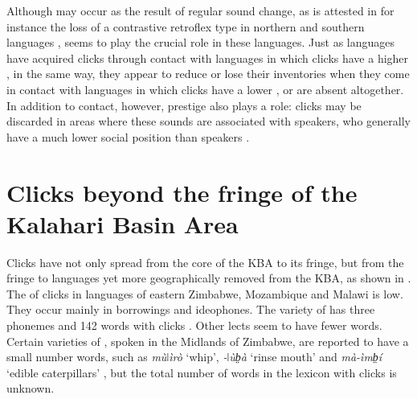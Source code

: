 \documentclass[output=paper
,newtxmath
,modfonts
,nonflat]{langsci/langscibook}
\begin{document}
Although  may occur as the result of regular sound change, as is attested in for instance the loss of a contrastive retroflex  type in northern and southern  languages \citep[cf.][]{Sands2010},  seems to play the crucial role in these  languages. Just as  languages have acquired clicks through contact with languages in which clicks have a higher , in the same way, they appear to reduce or lose their  inventories when they come in contact with languages in which clicks have a lower , or are absent altogether. In addition to contact, however, prestige also plays a role: clicks may be discarded in areas where these sounds are associated with  speakers, who generally have a much lower social position than  speakers \citep{Wilmsen1990}. 

\section{Clicks beyond the fringe of the Kalahari Basin Area}\label{sec:sands:4}

Clicks have not only spread from the core of the KBA to its fringe, but from the fringe to languages yet more geographically removed from the KBA, as shown in . The  of clicks in  languages of eastern Zimbabwe, Mozambique and Malawi is low. They occur mainly in borrowings and ideophones. The  variety of  has three  phonemes and 142 words with clicks \citep{Sitoe1996}. Other lects seem to have fewer  words. Certain varieties of , spoken in the Midlands of Zimbabwe, are reported to have a small number  words, such as \textit{mùǀìrò} ‘whip’, \textit{-ǀùb̤à} ‘rinse mouth’ and \textit{mà-{\textbar}ìmb̤í} ‘edible caterpillars’ \citep{Pongweni1990}, but the total number of words in the lexicon with clicks is unknown. 
\end{document}
